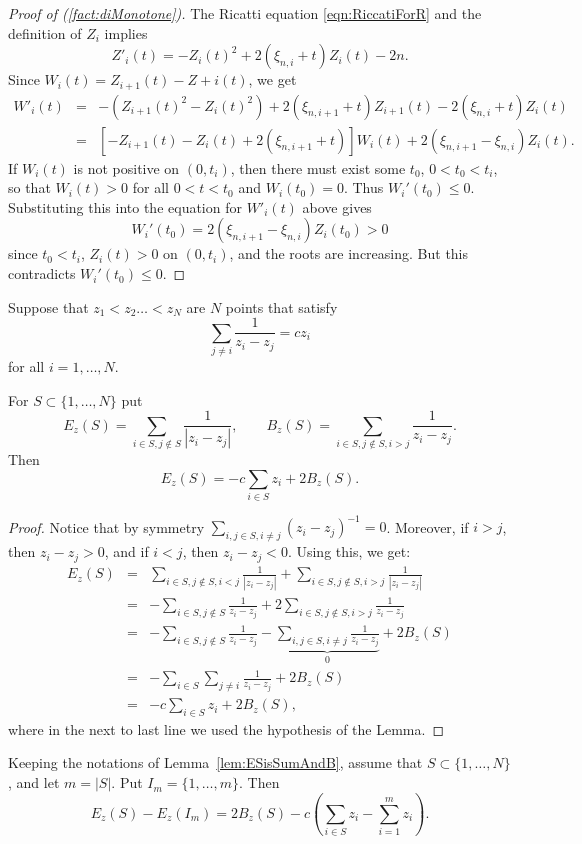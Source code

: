 \begin{proof}[Proof of (\ref{fact:diMonotone})]
    The Ricatti equation \eqref{eqn:RiccatiForR} and the definition of $Z_i$ implies $$Z'_i(t) = - Z_i(t)^2 + 2 (\xi_{n,i} +t) Z_i(t)-2n.$$ Since $W_i(t) = Z_{i+1} (t) - Z+i(t)$, we get \begin{eqnarray*}
        W'_i(t) &=& - (Z_{i+1}(t)^2 - Z_{i}(t)^2) + 2 (\xi_{n,i+1} + t) Z_{i+1}(t) - 2 (\xi_{n,i} + t) Z_{i}(t) \\
        &=& [ -Z_{i+1}(t) - Z_{i}(t) + 2 (\xi_{n,i+1} + t) ] W_{i}(t) + 2(\xi_{n,i+1}-\xi_{n,i}) Z_i(t).
    \end{eqnarray*}
    If $W_i(t)$ is not positive on $(0,t_i)$, then there must exist some $t_0$, $0<t_0<t_i$, so that $W_i(t)>0$ for all $0<t<t_0$ and $W_i(t_0)=0$.  Thus $W_i'(t_0)\leq 0$.   Substituting this into the equation for $W'_i(t)$ above gives
    $$
    W_i'(t_0) =  2(\xi_{n,i+1}-\xi_{n,i}) Z_i(t_0) > 0$$ since $t_0<t_i$, $Z_i(t)>0$ on $(0,t_i)$, and the roots are increasing.  But this contradicts $W_i'(t_0)\leq 0$. 
\end{proof}


\begin{lemma} \label{lem:ESisSumAndB}
    Suppose that $z_1 < z_2 \dots < z_N$ are $N$ points that satisfy $$ \sum_{j\neq i} \frac{1}{z_i-z_j} = cz_i$$ for all $i=1,\dots,N$. 
    
    For $S\subset\{1,\dots,N\}$ put $$E_z(S) = \sum_{i\in S,j\notin S}\frac{1}{|z_i -z_j|},\qquad B_z(S)=\sum_{i\in S,j\notin S,i>j} \frac{1}{z_i-z_j}.$$ Then $$ E_z(S) = -c \sum_{i\in S} z_i + 2 B_z(S).$$ 
\end{lemma}
\begin{proof}
    Notice that by symmetry $\sum_{i,j\in S,i\neq j} (z_i-z_j)^{-1} = 0$. Moreover, if $i>j$, then $z_i-z_j>0$, and if $i<j$, then $z_i-z_j <0$. Using this, we get:
    \begin{eqnarray*} 
        E_z(S) &=& \sum_{i\in S,j\notin S,i<j}\frac{1}{|z_i-z_j|}  + \sum_{i\in S,j\notin S,i>j}\frac{1}{|z_i-z_j|} \\ &=& - \sum_{i\in S,j\notin S}\frac{1}{z_i-z_j} + 2\sum_{i\in S,j\notin S,i>j}\frac{1}{z_i-z_j} \\ &=& -\sum_{i\in S,j\notin S}\frac{1}{z_i-z_j} - \underbrace{\sum_{i,j \in S, i\neq j}\frac{1}{z_i-z_j}}_{0} + 2B_z(S) \\
        &=& -\sum_{i\in S} \sum_{j\neq i} \frac{1}{z_i-z_j} + 2B_z(S) \\
        &=& - c\sum_{i\in S} z_i + 2B_z(S),
    \end{eqnarray*} where in the next to last line we used the hypothesis of the Lemma.
\end{proof}
\begin{lemma} \label{lem:energyVsCrossover}
    Keeping the notations of Lemma~\ref{lem:ESisSumAndB}, assume that $S\subset \{1,\dots,N\}$, and let $m=|S|$.  Put $I_m=\{1,\dots,m\}$. Then $$E_z(S)-E_z(I_m) = 2  B_z(S) - c \left(\sum_{i\in S}z_i - \sum_{i=1}^m z_i\right).$$
\end{lemma}



